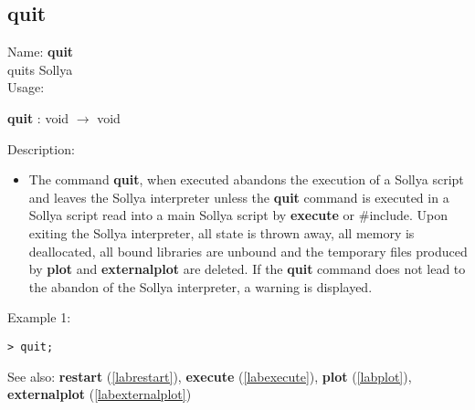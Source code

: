 \subsection{quit}
\label{labquit}
\noindent Name: \textbf{quit}\\
quits Sollya\\

\noindent Usage: 
\begin{center}
\textbf{quit} : \textsf{void} $\rightarrow$ \textsf{void}\\
\end{center}
\noindent Description: \begin{itemize}

\item The command \textbf{quit}, when executed abandons the execution of a Sollya
   script and leaves the Sollya interpreter unless the \textbf{quit} command 
   is executed in a Sollya script read into a main Sollya script by
   \textbf{execute} or $\#$include.
   Upon exiting the Sollya interpreter, all state is thrown away, all
   memory is deallocated, all bound libraries are unbound and the
   temporary files produced by \textbf{plot} and \textbf{externalplot} are deleted.
   If the \textbf{quit} command does not lead to the abandon of the Sollya
   interpreter, a warning is displayed.
\end{itemize}
\noindent Example 1: 
\begin{center}\begin{minipage}{15cm}\begin{Verbatim}[frame=single]
> quit;
\end{Verbatim}
\end{minipage}\end{center}
See also: \textbf{restart} (\ref{labrestart}), \textbf{execute} (\ref{labexecute}), \textbf{plot} (\ref{labplot}), \textbf{externalplot} (\ref{labexternalplot})
